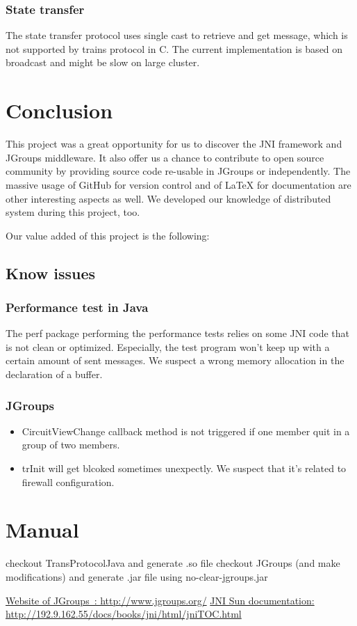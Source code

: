\documentclass[a4paper,10pt]{report}
\begin{document}
\subsection{State transfer}
The state transfer protocol uses single cast to retrieve and get message, which is not supported by trains protocol in C. The current implementation is based on broadcast and might be slow on large cluster.  

\chapter{Conclusion}
This project was a great opportunity for us to discover the JNI framework and JGroups middleware.
It also offer us a chance to contribute to open source community by providing source code re-usable in JGroups or independently.
The massive usage of GitHub for version control and of LaTeX for documentation are other interesting aspects as well.
We developed our knowledge of distributed system during this project, too.

Our value added of this project is the following:


\section{Know issues}

\subsection{Performance test in Java}

The perf package performing the performance tests relies on some JNI code that is not clean or optimized. Especially, the test program won't keep up with a certain amount of sent messages. We suspect a wrong memory allocation in the declaration of a buffer.

\subsection{JGroups}

\begin{itemize}
\item CircuitViewChange callback method is not triggered if one member quit in a group of two members.
\item trInit will get blcoked sometimes unexpectly. We suspect that it's related to firewall configuration.
\end{itemize}

\chapter{Manual}
checkout TransProtocolJava and generate .so file
checkout JGroups (and make modifications) and generate .jar file using no-clear-jgroups.jar

\listoffigures

\begin{thebibliography}{99}
   \href{http://www.jgroups.org/}{Website of JGroups~: http://www.jgroups.org/}
   \href{http://192.9.162.55/docs/books/jni/html/jniTOC.html}{JNI Sun documentation: http://192.9.162.55/docs/books/jni/html/jniTOC.html}
\end{thebibliography}
\end{document}
